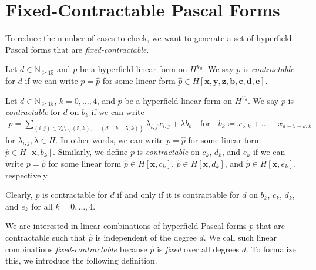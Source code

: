 \section{Fixed-Contractable Pascal Forms}

To reduce the number of cases to check, we want to generate a set of hyperfield Pascal forms that are \emph{fixed-contractable}.

\begin{definition}
    Let \( d \in \mathbb{N}_{\geq 15} \) and \( p \) be a hyperfield linear form on \( H^{V_d} \). We say \( p \) is \emph{contractable} for \( d \) if we can write \( p = \hat p \) for some linear form \( \hat p \in H[\mathbf{x}, \mathbf{y}, \mathbf{z}, \mathbf{b}, \mathbf{c}, \mathbf{d}, \mathbf{e}] \). 
\end{definition}

\begin{definition}
    Let \( d \in \mathbb{N}_{\geq 15} \), \( k = 0, \dots ,4 \), and \( p \) be a hyperfield linear form on \( H^{V_d} \). We say \( p \) is \emph{contractable} for \( d \) on \( b_k \) if we can write
    \begin{align*}
        p = \sum_{(i,j) \in V_d \setminus \left\{ (5,k), \dots, (d-k-5, k) \right\}} \lambda_{i,j} x_{i,j}  +\lambda b_k \quad \text{for} \quad b_k \coloneqq x_{5,k} + \dots + x_{d-5-k,k}
    \end{align*}
    for \( \lambda_{i,j}, \lambda \in H \). In other words, we can write \( p = \hat p \) for some linear form \( \hat p \in H[\mathbf{x}, b_k] \). 
    Similarly, we define \( p \) is \emph{contractable} on \( c_k \), \( d_k \), and \( e_k \) if we can write \( p = \hat p \) for some linear form \( \hat p \in H[\mathbf{x}, c_k] \), \( \hat p \in H[\mathbf{x}, d_k] \), and \( \hat p \in H[\mathbf{x}, e_k] \), respectively.
\end{definition}

\begin{remark}
    Clearly, \( p \) is contractable for \( d \) if and only if it is contractable for \( d \) on \( b_k \), \( c_k \), \( d_k \), and \( e_k \) for all \( k = 0, \dots, 4 \).
\end{remark}

We are interested in linear combinations of hyperfield Pascal forms \( p \) that are contractable such that \( \hat p \) is independent of the degree \( d \). We call such linear combinations \emph{fixed-contractable} because \( \hat p \) is \emph{fixed} over all degrees \( d \). To formalize this, we introduce the following definition.


